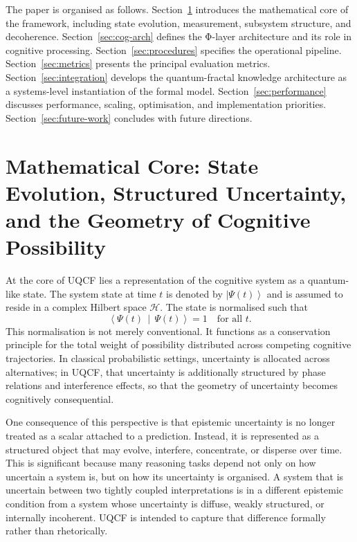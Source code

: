 \documentclass[12pt]{article}
\newcommand{\ket}[1]{\left|#1\right\rangle}
\newcommand{\braket}[2]{\left\langle#1\,\middle|\,#2\right\rangle}
\begin{document}
The paper is organised as follows. Section~\ref{sec:math-core} introduces the mathematical core of the framework, including state evolution, measurement, subsystem structure, and decoherence. Section~\ref{sec:cog-arch} defines the Φ-layer architecture and its role in cognitive processing. Section~\ref{sec:procedures} specifies the operational pipeline. Section~\ref{sec:metrics} presents the principal evaluation metrics. Section~\ref{sec:integration} develops the quantum-fractal knowledge architecture as a systems-level instantiation of the formal model. Section~\ref{sec:performance} discusses performance, scaling, optimisation, and implementation priorities. Section~\ref{sec:future-work} concludes with future directions.

\section{Mathematical Core: State Evolution, Structured Uncertainty, and the Geometry of Cognitive Possibility}\label{sec:math-core}
At the core of UQCF lies a representation of the cognitive system as a quantum-like state. The system state at time $t$ is denoted by $\ket{\Psi(t)}$ and is assumed to reside in a complex Hilbert space $\mathcal{H}$. The state is normalised such that
\begin{equation}
\braket{\Psi(t)}{\Psi(t)} = 1 \quad \text{for all } t.
\end{equation}
This normalisation is not merely conventional. It functions as a conservation principle for the total weight of possibility distributed across competing cognitive trajectories. In classical probabilistic settings, uncertainty is allocated across alternatives; in UQCF, that uncertainty is additionally structured by phase relations and interference effects, so that the geometry of uncertainty becomes cognitively consequential.

One consequence of this perspective is that epistemic uncertainty is no longer treated as a scalar attached to a prediction. Instead, it is represented as a structured object that may evolve, interfere, concentrate, or disperse over time. This is significant because many reasoning tasks depend not only on how uncertain a system is, but on how its uncertainty is organised. A system that is uncertain between two tightly coupled interpretations is in a different epistemic condition from a system whose uncertainty is diffuse, weakly structured, or internally incoherent. UQCF is intended to capture that difference formally rather than rhetorically.
\end{document}
